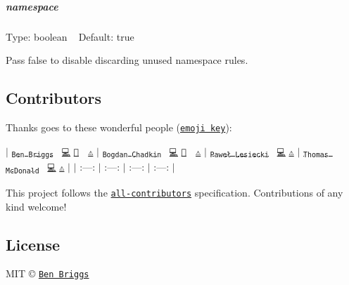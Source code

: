 \subparagraph*{namespace}

Type\+: {\ttfamily boolean} ~\newline
Default\+: {\ttfamily true}

Pass {\ttfamily false} to disable discarding unused namespace rules.

\subsection*{Contributors}

Thanks goes to these wonderful people (\href{https://github.com/kentcdodds/all-contributors#emoji-key}{\tt emoji key})\+:

$\vert$ \href{http://beneb.info}{\tt \textsubscript{Ben Briggs}}~\newline
\href{https://github.com/ben-eb/postcss-discard-unused/commits?author=ben-eb}{\tt 💻} \href{https://github.com/ben-eb/postcss-discard-unused/commits?author=ben-eb}{\tt 📖} 👀 \href{https://github.com/ben-eb/postcss-discard-unused/commits?author=ben-eb}{\tt ⚠️} $\vert$ \href{https://github.com/TrySound}{\tt \textsubscript{Bogdan Chadkin}}~\newline
\href{https://github.com/ben-eb/postcss-discard-unused/commits?author=TrySound}{\tt 💻} \href{https://github.com/ben-eb/postcss-discard-unused/commits?author=TrySound}{\tt 📖} 👀 \href{https://github.com/ben-eb/postcss-discard-unused/commits?author=TrySound}{\tt ⚠️} $\vert$ \href{https://github.com/plesiecki}{\tt \textsubscript{Paweł Lesiecki}}~\newline
\href{https://github.com/ben-eb/postcss-discard-unused/commits?author=plesiecki}{\tt 💻} \href{https://github.com/ben-eb/postcss-discard-unused/commits?author=plesiecki}{\tt ⚠️} $\vert$ \href{https://github.com/thomas-mcdonald}{\tt \textsubscript{Thomas Mc\+Donald}}~\newline
\href{https://github.com/ben-eb/postcss-discard-unused/commits?author=thomas-mcdonald}{\tt 💻} \href{https://github.com/ben-eb/postcss-discard-unused/commits?author=thomas-mcdonald}{\tt ⚠️} $\vert$ $\vert$ \+:---\+: $\vert$ \+:---\+: $\vert$ \+:---\+: $\vert$ \+:---\+: $\vert$

This project follows the \href{https://github.com/kentcdodds/all-contributors}{\tt all-\/contributors} specification. Contributions of any kind welcome!

\subsection*{License}

M\+IT © \href{http://beneb.info}{\tt Ben Briggs} 